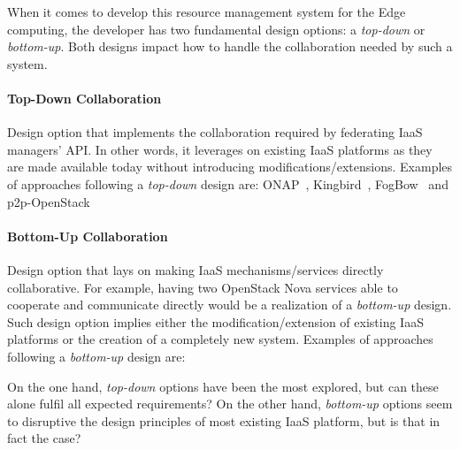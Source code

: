 When it comes to develop this resource management system for the Edge
computing, the developer has two fundamental design options: a \emph{top-down} or
\emph{bottom-up}. Both designs impact how to handle the
collaboration needed by such a system.

\paragraph{Top-Down Collaboration}
Design option that implements the collaboration required by
federating IaaS managers' API. In other words, it leverages on existing IaaS platforms as they are made available today without introducing modifications/extensions. Examples of approaches following a \emph{top-down} design are: ONAP~\cite{onap}, Kingbird~\cite{kingbird}, FogBow~\cite{brasileiro2016fogbow} and p2p-OpenStack~\cite{ericsson-p2p}


\paragraph{Bottom-Up Collaboration} Design option that lays on making IaaS mechanisms/services directly collaborative. For example, having two OpenStack Nova services able to cooperate and communicate directly would be a realization of a \emph{bottom-up} design. Such design option implies either the modification/extension of existing IaaS platforms or the creation of a completely new system. Examples of approaches following a \emph{bottom-up} design are:

On the one hand, \emph{top-down} options have been the most explored, but can these alone fulfil all expected requirements? On the other hand, \emph{bottom-up} options seem to disruptive the design principles of most existing IaaS platform, but is that in fact the case?
